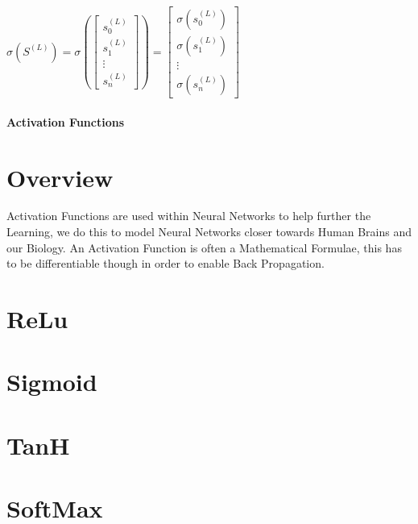 \begin{flushleft}
\begin{center}
                        $
                        \sigma(S^{(L)})
                        =
                        \sigma\left(
                        \begin{bmatrix}
                        s^{(L)}_{0} \\
                        s^{(L)}_{1} \\
                        \vdots      \\
                        s^{(L)}_{n} 
                        \end{bmatrix}
                        \right)
                        =
                        \begin{bmatrix}
                        \sigma(s^{(L)}_{0}) \\
                        \sigma(s^{(L)}_{1}) \\
                        \vdots              \\
                        \sigma(s^{(L)}_{n}) 
                        \end{bmatrix}
                        $ 
                    \end{center}
            \subsubsection{Activation Functions}
                \chapter{Overview}
                    \vspace{0.2cm}
                    Activation Functions are used within Neural Networks to help further the Learning, we do this to model Neural Networks
                    closer towards Human Brains and our Biology. An Activation Function is often a Mathematical Formulae, this has to be
                    differentiable though in order to enable Back Propagation. 
                \chapter{ReLu}
                \chapter{Sigmoid}
                \chapter{TanH}
                \chapter{SoftMax}

\end{flushleft}
